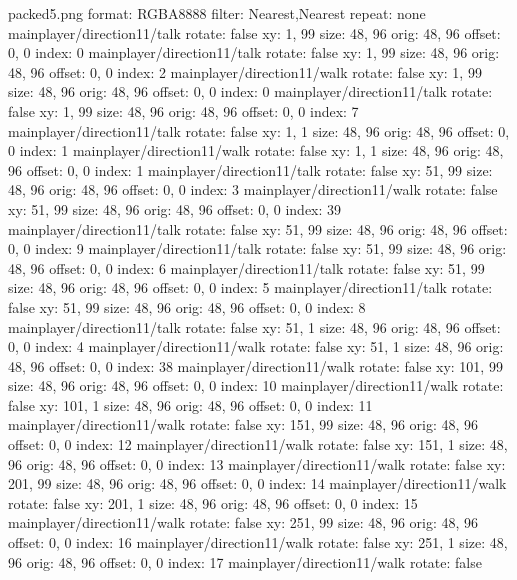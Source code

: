 packed5.png
format: RGBA8888
filter: Nearest,Nearest
repeat: none
mainplayer/direction11/talk
  rotate: false
  xy: 1, 99
  size: 48, 96
  orig: 48, 96
  offset: 0, 0
  index: 0
mainplayer/direction11/talk
  rotate: false
  xy: 1, 99
  size: 48, 96
  orig: 48, 96
  offset: 0, 0
  index: 2
mainplayer/direction11/walk
  rotate: false
  xy: 1, 99
  size: 48, 96
  orig: 48, 96
  offset: 0, 0
  index: 0
mainplayer/direction11/talk
  rotate: false
  xy: 1, 99
  size: 48, 96
  orig: 48, 96
  offset: 0, 0
  index: 7
mainplayer/direction11/talk
  rotate: false
  xy: 1, 1
  size: 48, 96
  orig: 48, 96
  offset: 0, 0
  index: 1
mainplayer/direction11/walk
  rotate: false
  xy: 1, 1
  size: 48, 96
  orig: 48, 96
  offset: 0, 0
  index: 1
mainplayer/direction11/talk
  rotate: false
  xy: 51, 99
  size: 48, 96
  orig: 48, 96
  offset: 0, 0
  index: 3
mainplayer/direction11/walk
  rotate: false
  xy: 51, 99
  size: 48, 96
  orig: 48, 96
  offset: 0, 0
  index: 39
mainplayer/direction11/talk
  rotate: false
  xy: 51, 99
  size: 48, 96
  orig: 48, 96
  offset: 0, 0
  index: 9
mainplayer/direction11/talk
  rotate: false
  xy: 51, 99
  size: 48, 96
  orig: 48, 96
  offset: 0, 0
  index: 6
mainplayer/direction11/talk
  rotate: false
  xy: 51, 99
  size: 48, 96
  orig: 48, 96
  offset: 0, 0
  index: 5
mainplayer/direction11/talk
  rotate: false
  xy: 51, 99
  size: 48, 96
  orig: 48, 96
  offset: 0, 0
  index: 8
mainplayer/direction11/talk
  rotate: false
  xy: 51, 1
  size: 48, 96
  orig: 48, 96
  offset: 0, 0
  index: 4
mainplayer/direction11/walk
  rotate: false
  xy: 51, 1
  size: 48, 96
  orig: 48, 96
  offset: 0, 0
  index: 38
mainplayer/direction11/walk
  rotate: false
  xy: 101, 99
  size: 48, 96
  orig: 48, 96
  offset: 0, 0
  index: 10
mainplayer/direction11/walk
  rotate: false
  xy: 101, 1
  size: 48, 96
  orig: 48, 96
  offset: 0, 0
  index: 11
mainplayer/direction11/walk
  rotate: false
  xy: 151, 99
  size: 48, 96
  orig: 48, 96
  offset: 0, 0
  index: 12
mainplayer/direction11/walk
  rotate: false
  xy: 151, 1
  size: 48, 96
  orig: 48, 96
  offset: 0, 0
  index: 13
mainplayer/direction11/walk
  rotate: false
  xy: 201, 99
  size: 48, 96
  orig: 48, 96
  offset: 0, 0
  index: 14
mainplayer/direction11/walk
  rotate: false
  xy: 201, 1
  size: 48, 96
  orig: 48, 96
  offset: 0, 0
  index: 15
mainplayer/direction11/walk
  rotate: false
  xy: 251, 99
  size: 48, 96
  orig: 48, 96
  offset: 0, 0
  index: 16
mainplayer/direction11/walk
  rotate: false
  xy: 251, 1
  size: 48, 96
  orig: 48, 96
  offset: 0, 0
  index: 17
mainplayer/direction11/walk
  rotate: false
